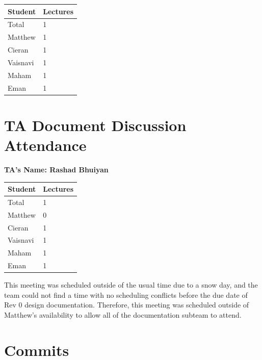 \documentclass{article}
\begin{document}

\begin{table}[H]
\centering
\begin{tabular}{ll}
\toprule
\textbf{Student} & \textbf{Lectures}\\
\midrule
Total & 1\\
Matthew & 1\\
Cieran & 1\\
Vaisnavi & 1\\
Maham & 1\\
Eman & 1\\
\bottomrule
\end{tabular}
\end{table}


\section{TA Document Discussion Attendance}


\noindent \textbf{TA's Name: Rashad Bhuiyan}

\begin{table}[H]
\centering
\begin{tabular}{ll}
\toprule
\textbf{Student} & \textbf{Lectures}\\
\midrule
Total & 1\\
Matthew & 0\\
Cieran & 1\\
Vaisnavi & 1\\
Maham & 1\\
Eman & 1\\
\bottomrule
\end{tabular}
\end{table}

This meeting was scheduled outside of the usual time due to a snow day, and the team could not find a time with no scheduling conflicts before the due date of Rev 0 design documentation. Therefore, this meeting was scheduled outside of Matthew's availability to allow all of the documentation subteam to attend.

\section{Commits}
\end{document}
